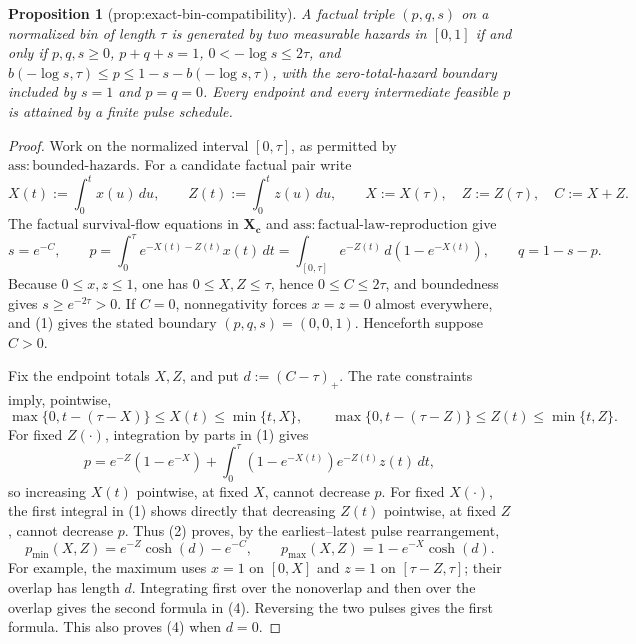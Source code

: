 \documentclass{article}
\newtheorem{proposition}{Proposition}
\begin{document}
\begin{proposition}[prop:exact-bin-compatibility]\label{prop:exact-bin-compatibility}
A factual triple \((p,q,s)\) on a normalized bin of length \(\tau\) is generated by two measurable hazards in \([0,1]\) if and only if \(p,q,s\ge0\), \(p+q+s=1\), \(0<-\log s\le2\tau\), and \(b(-\log s,\tau)\le p\le1-s-b(-\log s,\tau)\), with the zero-total-hazard boundary included by \(s=1\) and \(p=q=0\). Every endpoint and every intermediate feasible \(p\) is attained by a finite pulse schedule.
\end{proposition}
\begin{proof}
Work on the normalized interval \([0,\tau]\), as permitted by \(\mathrm{ass{:}bounded\text{-}hazards}\).  For a candidate factual pair write
\[
 X(t):=\int_0^t x(u)\,du,\quad\quad Z(t):=\int_0^t z(u)\,du,
 \quad\quad X:=X(\tau),\quad Z:=Z(\tau),\quad C:=X+Z.
\]
The factual survival-flow equations in \(\mathbf X_{\mathbf c}\) and \(\mathrm{ass{:}factual\text{-}law\text{-}reproduction}\) give
\[
 s=e^{-C},\quad\quad
 p=\int_0^\tau e^{-X(t)-Z(t)}x(t)\,dt
   =\int_{[0,\tau]}e^{-Z(t)}\,d(1-e^{-X(t)}),
 \quad\quad q=1-s-p.                                           \tag{1}
\]
Because \(0\le x,z\le1\), one has \(0\le X,Z\le\tau\), hence \(0\le C\le2\tau\), and boundedness gives \(s\ge e^{-2\tau}>0\).  If \(C=0\), nonnegativity forces \(x=z=0\) almost everywhere, and (1) gives the stated boundary \((p,q,s)=(0,0,1)\).  Henceforth suppose \(C>0\).

Fix the endpoint totals \(X,Z\), and put \(d:=(C-\tau)_+\).  The rate constraints imply, pointwise,
\[
 \max\{0,t-(\tau-X)\}\le X(t)\le\min\{t,X\},
 \quad\quad
 \max\{0,t-(\tau-Z)\}\le Z(t)\le\min\{t,Z\}.             \tag{2}
\]
For fixed \(Z(\cdot)\), integration by parts in (1) gives
\[
 p=e^{-Z}(1-e^{-X})+
   \int_0^\tau (1-e^{-X(t)})e^{-Z(t)}z(t)\,dt,              \tag{3}
\]
so increasing \(X(t)\) pointwise, at fixed \(X\), cannot decrease \(p\).  For fixed \(X(\cdot)\), the first integral in (1) shows directly that decreasing \(Z(t)\) pointwise, at fixed \(Z\), cannot decrease \(p\).  Thus (2) proves, by the earliest--latest pulse rearrangement,
\[
 p_{\min}(X,Z)=e^{-Z}\cosh(d)-e^{-C},
 \quad\quad
 p_{\max}(X,Z)=1-e^{-X}\cosh(d).                           \tag{4}
\]
For example, the maximum uses \(x=1\) on \([0,X]\) and \(z=1\) on \([\tau-Z,\tau]\); their overlap has length \(d\).  Integrating first over the nonoverlap and then over the overlap gives the second formula in (4).  Reversing the two pulses gives the first formula.  This also proves (4) when \(d=0\).


\end{proof}
\end{document}
